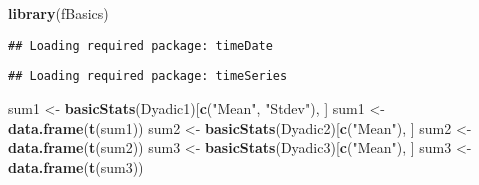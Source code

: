 \documentclass[]{tufte-handout}
\newenvironment{Shaded}{\begin{snugshade}}{\end{snugshade}}
\newcommand{\KeywordTok}[1]{\textcolor[rgb]{0.13,0.29,0.53}{\textbf{#1}}}
\newcommand{\StringTok}[1]{\textcolor[rgb]{0.31,0.60,0.02}{#1}}
\newcommand{\NormalTok}[1]{#1}
\begin{document}
\begin{Shaded}
\begin{Highlighting}[]
\KeywordTok{library}\NormalTok{(fBasics)}
\end{Highlighting}
\end{Shaded}

\begin{verbatim}
## Loading required package: timeDate
\end{verbatim}

\begin{verbatim}
## Loading required package: timeSeries
\end{verbatim}

\begin{Shaded}
\begin{Highlighting}[]
\NormalTok{sum1 <-}\StringTok{ }\KeywordTok{basicStats}\NormalTok{(Dyadic1)[}\KeywordTok{c}\NormalTok{(}\StringTok{"Mean"}\NormalTok{, }\StringTok{"Stdev"}\NormalTok{), }
\NormalTok{    ]}
\NormalTok{sum1 <-}\StringTok{ }\KeywordTok{data.frame}\NormalTok{(}\KeywordTok{t}\NormalTok{(sum1))}
\NormalTok{sum2 <-}\StringTok{ }\KeywordTok{basicStats}\NormalTok{(Dyadic2)[}\KeywordTok{c}\NormalTok{(}\StringTok{"Mean"}\NormalTok{), ]}
\NormalTok{sum2 <-}\StringTok{ }\KeywordTok{data.frame}\NormalTok{(}\KeywordTok{t}\NormalTok{(sum2))}
\NormalTok{sum3 <-}\StringTok{ }\KeywordTok{basicStats}\NormalTok{(Dyadic3)[}\KeywordTok{c}\NormalTok{(}\StringTok{"Mean"}\NormalTok{), ]}
\NormalTok{sum3 <-}\StringTok{ }\KeywordTok{data.frame}\NormalTok{(}\KeywordTok{t}\NormalTok{(sum3))}
\end{Highlighting}
\end{Shaded}
\end{document}

